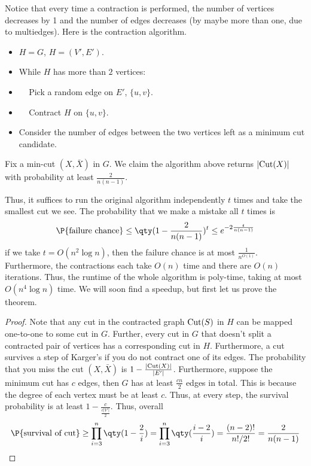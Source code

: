 Notice that every time a contraction is performed,
the number of vertices decreases by 1 and the number of edges decreases
(by maybe more than one, due to multiedges). Here is the contraction algorithm.

\begin{algothm}
    \begin{itemize}
        \item $H = G$, $H = (V', E')$.
        \item While $H$ has more than $2$ vertices:
        \item \,\,\,\,\, Pick a random edge on $E'$, $\{u, v\}$.
        \item \,\,\,\,\, Contract $H$ on $\{u, v\}$.
        \item Consider the number of edges between the two vertices
        left as a minimum cut candidate.
    \end{itemize}
\end{algothm}

\begin{theorem}
    Fix a min-cut $(X, \bar{X})$ in $G$. We claim the algorithm above returns $|\textrm{Cut}(X)|$ with probability at least
    $\frac{2}{n(n-1)}$.
\end{theorem}

Thus, it suffices to run the original algorithm independently $t$ times and take the smallest cut we see.
The probability that we make a mistake all $t$ times is
\[ \P{\text{failure chance}} \le \qty(1  - \frac{2}{n(n - 1)})^{t} \le e^{-2\frac{t}{n(n-1)}} \]
if we take $t = O(n^2 \log n)$, then the failure chance is at most $\frac{1}{n^{O(1)}}$. Furthermore,
the contractions each take $O(n)$ time and there are $O(n)$ iterations. Thus, the runtime of the whole
algorithm is poly-time, taking at most $O(n^4 \log n)$ time.
We will soon find a speedup, but first let us prove
the theorem.

\begin{proof}
    Note that any cut in the contracted graph $\textrm{Cut}(S)$ in $H$ can be mapped one-to-one to
    some cut in $G$. Further, every cut in $G$ that doesn't split a contracted pair of vertices
    has a corresponding cut in $H$. Furthermore, a cut survives a step of Karger's if you do not contract
    one of its edges. The probability that you miss the cut $(X, \bar{X})$
    is $1 - \frac{|\textrm{Cut}(X)|}{|E'|}$. Furthermore, suppose the minimum cut has $c$ edges,
    then $G$ has at least $\frac{cn}{2}$ edges in total. This is because the degree of each 
    vertex must be at least
    $c$. Thus, at every step, the survival probability is at least $1 - \frac{c}{\frac{c|V'|}{2}}$.
    Thus, overall
    \[\P{\text{survival of cut}}  \ge \prod_{i = 3}^{n} \qty(1 - \frac{2}{i}) =  \prod_{i = 3}^{n} \qty(\frac{i - 2}{i}) = \frac{(n - 2)!}{n!/2!} = \frac{2}{n(n-1)} \]
\end{proof}

